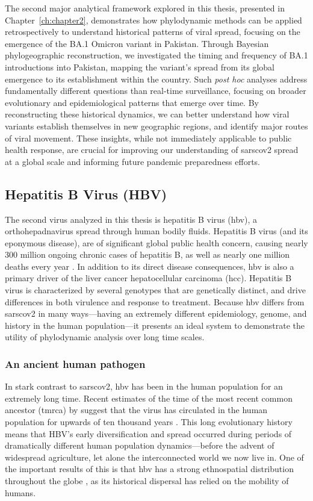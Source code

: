 The second major analytical framework explored in this thesis, presented in Chapter~\ref{ch:chapter2}, demonstrates how phylodynamic methods can be applied retrospectively to understand historical patterns of viral spread, focusing on the emergence of the BA.1 Omicron variant in Pakistan.
Through Bayesian phylogeographic reconstruction, we investigated the timing and frequency of BA.1 introductions into Pakistan, mapping the variant's spread from its global emergence to its establishment within the country.
Such \textit{post hoc} analyses address fundamentally different questions than real-time surveillance, focusing on broader evolutionary and epidemiological patterns that emerge over time.
By reconstructing these historical dynamics, we can better understand how viral variants establish themselves in new geographic regions, and identify major routes of viral movement.
These insights, while not immediately applicable to public health response, are crucial for improving our understanding of \gls{sarscov2} spread at a global scale and informing future pandemic preparedness efforts.

\subsection{Hepatitis B Virus (HBV)}
The second virus analyzed in this thesis is hepatitis B virus (\gls{hbv}), a orthohepadnavirus spread through human bodily fluids.
Hepatitis B virus (and its eponymous disease), are of significant global public health concern, causing nearly 300 million ongoing chronic cases of hepatitis B, as well as nearly one million deaths every year \citep{revill2020evolution}.
In addition to its direct disease consequences, \gls{hbv} is also a primary driver of the liver cancer hepatocellular carcinoma (\gls{hcc}).
Hepatitis B virus is characterized by several genotypes that are genetically distinct, and drive differences in both virulence and response to treatment.
Because \gls{hbv} differs from \gls{sarscov2} in many ways---having an extremely different epidemiology, genome, and history in the human population---it presents an ideal system to demonstrate the utility of phylodynamic analysis over long time scales.

\subsubsection{An ancient human pathogen}
In stark contrast to \gls{sarscov2}, \gls{hbv} has been in the human population for an extremely long time.
Recent estimates of the time of the most recent common ancestor (\gls{tmrca}) by \citet{kocher2021ten} suggest that the virus has circulated in the human population for upwards of ten thousand years \citep{kocher2021ten}.
This long evolutionary history means that HBV's early diversification and spread occurred during periods of dramatically different human population dynamics---before the advent of widespread agriculture, let alone the interconnected world we now live in. 
One of the important results of this is that \gls{hbv} has a strong ethnospatial distribution throughout the globe \citep{sunbul2014hepatitis}, as its historical dispersal has relied on the mobility of humans.

